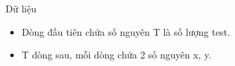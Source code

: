Dữ liệu
\begin{itemize}
	\item     Dòng đầu tiên chứa số nguyên T là số lượng test.   
	\item     T dòng sau, mỗi dòng chứa 2 số nguyên x, y.   
\end{itemize}